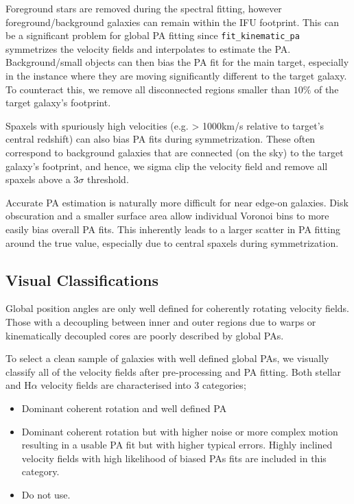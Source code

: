 \documentclass[fleqn,usenatbib]{mnras}
\begin{document}
Foreground stars are removed during the spectral fitting, however foreground/background galaxies can remain within the IFU footprint. This can be a significant problem for global PA fitting since \texttt{fit\_kinematic\_pa} symmetrizes the velocity fields and interpolates to estimate the PA. Background/small objects can then bias the PA fit for the main target, especially in the instance where they are moving significantly different to the target galaxy. To counteract this, we remove all disconnected regions smaller than $10\%$ of the target galaxy's footprint. 

Spaxels with spuriously high velocities (e.g. > 1000km/s relative to target's central redshift) can also bias PA fits during symmetrization. These often correspond to background galaxies that are connected (on the sky) to the target galaxy's footprint, and hence, we sigma clip the velocity field and remove all spaxels above a $3\sigma$ threshold.

Accurate PA estimation is naturally more difficult for near edge-on galaxies. Disk obscuration and a smaller surface area allow individual Voronoi bins to more easily bias overall PA fits. This inherently leads to a larger scatter in PA fitting around the true value, especially due to central spaxels during symmetrization.

\subsection{Visual Classifications} \label{sec:visual_classifications}
Global position angles are only well defined for coherently rotating velocity fields. Those with a decoupling between inner and outer regions due to warps or kinematically decoupled cores are poorly described by global PAs. 

To select a clean sample of galaxies with well defined global PAs, we visually classify all of the velocity fields after pre-processing and PA fitting. Both stellar and H$\alpha$ velocity fields are characterised into 3 categories;
\begin{itemize}
    \item Dominant coherent rotation and well defined PA
    \item Dominant coherent rotation but with higher noise or more complex motion resulting in a usable PA fit but with higher typical errors. Highly inclined velocity fields with high likelihood of biased PAs fits are included in this category. 
    \item Do not use.
\end{itemize}
\end{document}
